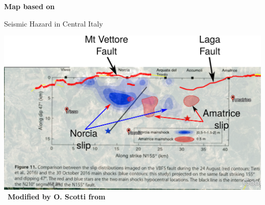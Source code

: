 \documentclass{beamer}
\begin{document}
\begin{frame}
\begin{center}
\begin{center}
\begin{minipage}{0.33\linewidth}
  \vskip 0.2cm
  {\bf \tiny Map based on \cite{Walker_2021_FAULT2SHA}} \end{minipage}
 \end{center}
 \end{center}
  \addtocounter{framenumber}{-1}
  
\end{frame}


\begin{frame}
 {Seismic Hazard in Central Italy}

 \begin{center}
 \begin{center}
 \begin{minipage}{0.65\linewidth}
  \includegraphics[width=1\linewidth]{images/amatrice_3.pdf} \,
  \vskip 0.2cm
  {\bf \tiny Modified by O. Scotti from \cite{Scognamiglio_2018_CFG}} \end{minipage}
 \begin{minipage}{0.33\linewidth}

\end{minipage}
\end{center}
\end{center}
\end{frame}
\end{document}
